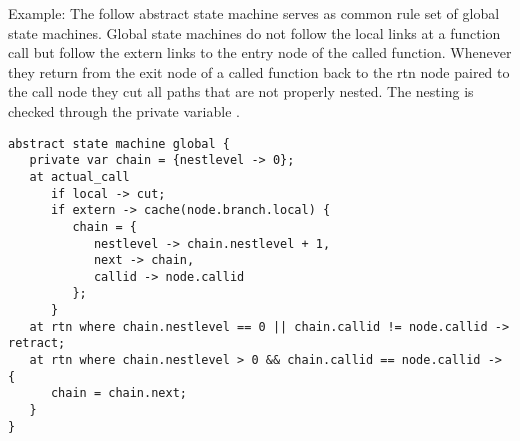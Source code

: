 \noindent
Example: The follow abstract state machine serves as common rule set
of global state machines. Global state machines do not follow
the local links at a function call but follow the extern links to
the entry node of the called function. Whenever they return from
the exit node of a called function back to the rtn node paired
to the call node they cut all paths that are not properly nested.
The nesting is checked through the private variable .

\label{smglobal}
\begin{lstlisting}
abstract state machine global {
   private var chain = {nestlevel -> 0};
   at actual_call
      if local -> cut;
      if extern -> cache(node.branch.local) {
         chain = {
            nestlevel -> chain.nestlevel + 1,
            next -> chain,
            callid -> node.callid
         };
      }
   at rtn where chain.nestlevel == 0 || chain.callid != node.callid -> retract;
   at rtn where chain.nestlevel > 0 && chain.callid == node.callid -> {
      chain = chain.next;
   }
}
\end{lstlisting}

\endinput

